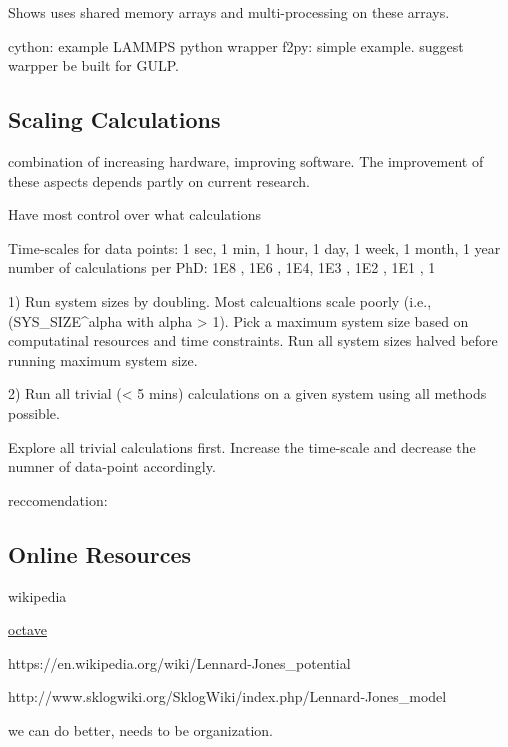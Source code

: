 Shows uses shared memory arrays and multi-processing on these arrays. 




cython: example LAMMPS python wrapper
f2py: simple example. suggest warpper be built for GULP.

\subsection{Scaling Calculations}

combination of increasing hardware, improving software.  The 
improvement of these aspects depends partly on current 
research.  

Have most control over what calculations

Time-scales for data points: 
1 sec, 1 min, 1 hour, 1 day, 1 week, 1 month, 1 year 
number of calculations per PhD:
1E8 , 1E6 , 1E4, 1E3 , 1E2 , 1E1 , 1

1) Run system sizes by doubling. Most calcualtions scale poorly (i.e., 
(SYS_SIZE^alpha with alpha > 1). Pick a maximum system size based 
on computatinal resources and time constraints.  Run all system sizes 
halved before running maximum system size. 

2) Run all trivial (< 5 mins) calculations on a given system using all 
methods possible. 

Explore all trivial calculations first. Increase the time-scale and 
decrease the numner of data-point accordingly. 

reccomendation: 


\subsection{Online Resources}

wikipedia

\href{http://www.sklogwiki.org/SklogWiki/index.php/Main_Page}
{octave}

https://en.wikipedia.org/wiki/Lennard-Jones_potential

http://www.sklogwiki.org/SklogWiki/index.php/Lennard-Jones_model

we can do better, needs to be organization. 

